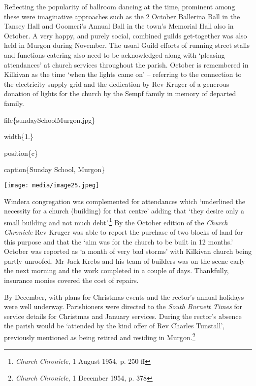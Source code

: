 Reflecting the popularity of ballroom dancing at the time, prominent among these were imaginative approaches such as the 2 October Ballerina Ball in the Tansey Hall and Goomeri's Annual Ball in the town's Memorial Hall also in October. A very happy, and purely social, combined guilds get-together was also held in Murgon during November. The usual Guild efforts of running street stalls and functions catering also need to be acknowledged along with `pleasing attendances' at church services throughout the parish. October is remembered in Kilkivan as the time `when the lights came on' -- referring to the connection to the electricity supply grid and the dedication by Rev Kruger of a generous donation of lights for the church by the Sempf family in memory of departed family.

file\{sundaySchoolMurgon.jpg\}

width\{1.\}

position\{c\}

caption\{Sunday School, Murgon\}

\texttt{[image: media/image25.jpeg]}

Windera congregation was complemented for attendances which `underlined the necessity for a church (building) for that centre' adding that `they desire only a small building and not much debt'.\footnote{\emph{Church Chronicle,} 1 August 1954, p. 250 ff} By the October edition of the \emph{Church Chronicle} Rev Kruger was able to report the purchase of two blocks of land for this purpose and that the `aim was for the church to be built in 12 months.' October was reported as `a month of very bad storms' with Kilkivan church being partly unroofed. Mr Jack Krebs and his team of builders was on the scene early the next morning and the work completed in a couple of days. Thankfully, insurance monies covered the cost of repairs.

By December, with plans for Christmas events and the rector's annual holidays were well underway. Parishioners were directed to the \emph{South Burnett Times} for service details for Christmas and January services. During the rector's absence the parish would be `attended by the kind offer of Rev Charles Tunstall', previously mentioned as being retired and residing in Murgon.\footnote{\emph{Church Chronicle,} 1 December 1954, p. 378}

